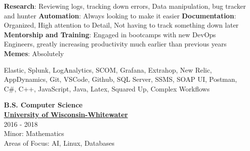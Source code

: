 \documentclass[a4paper]{mctemplate} %
\begin{document}
\begin{sidebar}


\vspace{20mm}
\begin{contacttable}
\end{contacttable}


\begin{skilltable}
	\skillitem
	{\textbf{Research}: Reviewing logs, tracking down errors, Data manipulation, bug tracker and hunter}
	\skillitem
	{\textbf{Automation}: Always looking to make it easier}
	\skillitem
	{\textbf{Documentation}: Organized, High attention to Detail, Not having to track something down later}
	\skillitem
	{\textbf{Mentorship and Training}: Engaged in bootcamps with new DevOps Engineers, greatly increasing productivity much earlier than previous years}
	\skillitem
	{\textbf{Memes}: Absolutely}
\end{skilltable}




\begin{codingtable}
	{Elastic, Splunk, LogAnalytics, SCOM, Grafana, Extrahop, New Relic, AppDynamics, Git, VSCode, Github, SQL Server, SSMS, SOAP UI, Postman, C\#, C++, JavaScript, Java, Latex, Squared Up, Complex Workflows}
\end{codingtable}

\begin{education}
    {\textbf{B.S. Computer Science}} \\ 
    {\href{https://www.uww.edu/}{\textbf{University of Wisconsin-Whitewater}}} \\
    {2016 - 2018} \\
    {Minor: Mathematics} \\
    {Areas of Focus: AI, Linux, Databases}
\end{education}

\end{sidebar}
\end{document}
